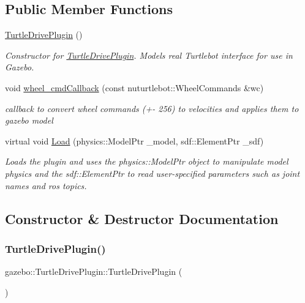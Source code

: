 \subsection*{Public Member Functions}
\begin{DoxyCompactItemize}
\item 
\hyperlink{classgazebo_1_1TurtleDrivePlugin_a7a36efc4658c4e4b1cedcdd70517e7dc}{Turtle\+Drive\+Plugin} ()
\begin{DoxyCompactList}\small\item\em Constructor for \hyperlink{classgazebo_1_1TurtleDrivePlugin}{Turtle\+Drive\+Plugin}. Models real Turtlebot interface for use in Gazebo. \end{DoxyCompactList}\item 
void \hyperlink{classgazebo_1_1TurtleDrivePlugin_ab80df6990ee5bc40d968834ba97c7bb2}{wheel\+\_\+cmd\+Callback} (const nuturtlebot\+::\+Wheel\+Commands \&wc)
\begin{DoxyCompactList}\small\item\em callback to convert wheel commands (+-\/ 256) to velocities and applies them to gazebo model \end{DoxyCompactList}\item 
virtual void \hyperlink{classgazebo_1_1TurtleDrivePlugin_a41993122444281e45f38a5e5171be76a}{Load} (physics\+::\+Model\+Ptr \+\_\+model, sdf\+::\+Element\+Ptr \+\_\+sdf)
\begin{DoxyCompactList}\small\item\em Loads the plugin and uses the physics\+::\+Model\+Ptr object to manipulate model physics and the sdf\+::\+Element\+Ptr to read user-\/specified parameters such as joint names and ros topics. \end{DoxyCompactList}\end{DoxyCompactItemize}


\subsection{Constructor \& Destructor Documentation}
\mbox{\label{classgazebo_1_1TurtleDrivePlugin_a7a36efc4658c4e4b1cedcdd70517e7dc}} 
\subsubsection{\texorpdfstring{Turtle\+Drive\+Plugin()}{TurtleDrivePlugin()}}
{\footnotesize\ttfamily gazebo\+::\+Turtle\+Drive\+Plugin\+::\+Turtle\+Drive\+Plugin (\begin{DoxyParamCaption}{ }\end{DoxyParamCaption})}



